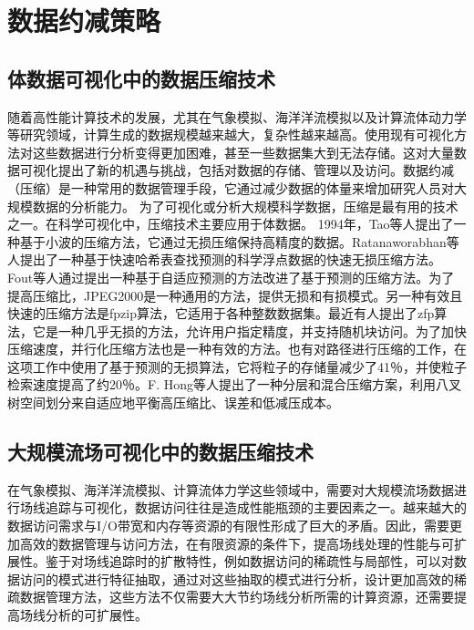 \section{数据约减策略}
\subsection{体数据可视化中的数据压缩技术}
随着高性能计算技术的发展，尤其在气象模拟、海洋洋流模拟以及计算流体动力学等研究领域，计算生成的数据规模越来越大，复杂性越来越高。使用现有可视化方法对这些数据进行分析变得更加困难，甚至一些数据集大到无法存储。这对大量数据可视化提出了新的机遇与挑战，包括对数据的存储、管理以及访问。数据约减（压缩）是一种常用的数据管理手段，它通过减少数据的体量来增加研究人员对大规模数据的分析能力。
为了可视化或分析大规模科学数据，压缩是最有用的技术之一。在科学可视化中，压缩技术主要应用于体数据。 1994年，Tao等人提出了一种基于小波的压缩方法\cite{tao1994progressive}，它通过无损压缩保持高精度的数据。Ratanaworabhan等人提出了一种基于快速哈希表查找预测的科学浮点数据的快速无损压缩方法\cite{ratanaworabhan2006fast}。Fout等人通过提出一种基于自适应预测的方法\cite{fout2012adaptive}改进了基于预测的压缩方法。为了提高压缩比，JPEG2000\cite{usevitch2005jpeg2000}是一种通用的方法，提供无损和有损模式。另一种有效且快速的压缩方法是fpzip算法\cite{isenburg2005lossless}，它适用于各种整数数据集。最近有人提出了zfp算法\cite{lindstrom2014fixed}，它是一种几乎无损的方法，允许用户指定精度，并支持随机块访问。为了加快压缩速度，并行化压缩方法也是一种有效的方法\cite{bi20142}。也有对路径进行压缩的工作\cite{ellsworth2004interactive}，在这项工作中使用了基于预测的无损算法，它将粒子的存储量减少了41％，并使粒子检索速度提高了约20％。F. Hong等人提出了一种分层和混合压缩方案\cite{hong2017compression}，利用八叉树空间划分来自适应地平衡高压缩比、误差和低减压成本。

\subsection{大规模流场可视化中的数据压缩技术}
在气象模拟、海洋洋流模拟、计算流体力学这些领域中，需要对大规模流场数据进行场线追踪与可视化，数据访问往往是造成性能瓶颈的主要因素之一。越来越大的数据访问需求与I/O带宽和内存等资源的有限性形成了巨大的矛盾。因此，需要更加高效的数据管理与访问方法，在有限资源的条件下，提高场线处理的性能与可扩展性。鉴于对场线追踪时的扩散特性，例如数据访问的稀疏性与局部性，可以对数据访问的模式进行特征抽取，通过对这些抽取的模式进行分析，设计更加高效的稀疏数据管理方法，这些方法不仅需要大大节约场线分析所需的计算资源，还需要提高场线分析的可扩展性。

